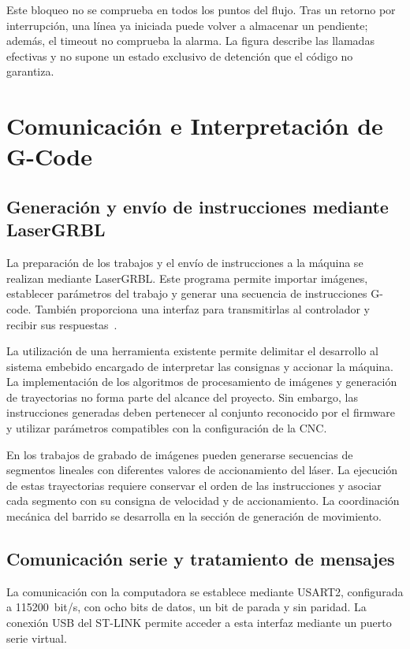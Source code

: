 \documentclass[blue,fullpaper]{ludusofficial}  %
\begin{document}
Este bloqueo no se comprueba en todos los puntos del flujo. Tras un retorno por interrupción, una línea ya iniciada puede volver a almacenar un pendiente; además, el timeout no comprueba la alarma. La figura describe las llamadas efectivas y no supone un estado exclusivo de detención que el código no garantiza.

\section{Comunicación e Interpretación de G-Code}
\label{sec:comunicacion}

\subsection{Generación y envío de instrucciones mediante LaserGRBL}

La preparación de los trabajos y el envío de instrucciones
a la máquina se realizan mediante LaserGRBL. Este programa
permite importar imágenes, establecer parámetros del trabajo
y generar una secuencia de instrucciones G-code. También
proporciona una interfaz para transmitirlas al controlador
y recibir sus respuestas~\cite{lasergrbl_import}.

La utilización de una herramienta existente permite
delimitar el desarrollo al sistema embebido encargado
de interpretar las consignas y accionar la máquina.
La implementación de los algoritmos de procesamiento
de imágenes y generación de trayectorias no forma parte
del alcance del proyecto. Sin embargo, las instrucciones
generadas deben pertenecer al conjunto reconocido por
el firmware y utilizar parámetros compatibles con
la configuración de la CNC.

En los trabajos de grabado de imágenes pueden generarse
secuencias de segmentos lineales con diferentes valores
de accionamiento del láser. La ejecución de estas
trayectorias requiere conservar el orden de las instrucciones
y asociar cada segmento con su consigna de velocidad
y de accionamiento. La coordinación mecánica del barrido
se desarrolla en la sección de generación de movimiento.

\subsection{Comunicación serie y tratamiento de mensajes}

La comunicación con la computadora se establece mediante
USART2, configurada a 115200~bit/s, con ocho bits de datos,
un bit de parada y sin paridad. La conexión USB del ST-LINK
permite acceder a esta interfaz mediante un puerto
serie virtual.
\end{document}
